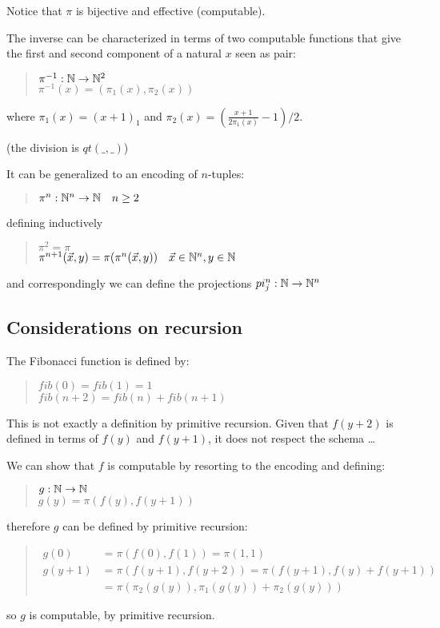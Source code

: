 Notice that $\pi$ is bijective and effective (computable).

The inverse can be characterized in terms of two computable functions that give the first and second component of a natural $x$ seen as pair:

\begin{quote}
  $\pi^{-1}:\mathbb{N}\rightarrow\mathbb{N}^2$\\
  $\pi^{-1}(x) = (\pi_1(x),\pi_2(x))$
\end{quote}
%
where $\pi_1(x) = (x+1)_1$ and 
$\pi_2(x) = (\frac{x+1}{2\pi_1(x)}-1)/2$.

(the division is $qt(\_,\_)$)

It can be generalized to an encoding of $n$-tuples:
\begin{quote}
  $\pi^n: \mathbb{N}^n\rightarrow\mathbb{N} \quad n\geq2$
\end{quote}
defining inductively
\begin{quote}
  $\pi^2 = \pi$\\
  $\pi^{n+1}(\vec{x},y) = \pi(\pi^n(\vec{x},y)) \quad \vec{x} \in \mathbb{N}^n, y \in \mathbb{N}$
\end{quote}

and correspondingly we can define the projections $pi_j^n:\mathbb{N}\rightarrow\mathbb{N}^n$

\subsection{Considerations on recursion}

The Fibonacci function is defined by:

\begin{quote}
  $ fib(0) = fib(1) = 1$\\
  $fib(n+2) = fib(n) + fib(n+1)$
\end{quote}

This is not exactly a definition by primitive recursion. Given that $f(y+2)$ is defined in terms of $f(y)$ and $f(y+1)$, it does not respect the schema \dots

We can show that $f$ is computable by resorting to the encoding and defining:

\begin{quote}
  $g:\mathbb{N}\rightarrow\mathbb{N}$\\
  $g(y) = \pi(f(y),f(y+1))$\\
\end{quote}

therefore $g$ can be defined by primitive recursion:

\begin{quote}
  $\begin{array}{ll}
     g(0) & =  \pi(f(0),f(1)) = \pi(1,1)\\[2mm]
     g(y+1)  & = \pi(f(y+1),f(y+2)) = \pi(f(y+1),f(y)+f(y+1))\\
              & = \pi(\pi_2(g(y)), \pi_1(g(y)) + \pi_2(g(y)))
   \end{array}
   $
\end{quote}
so $g$ is computable, by primitive recursion.

